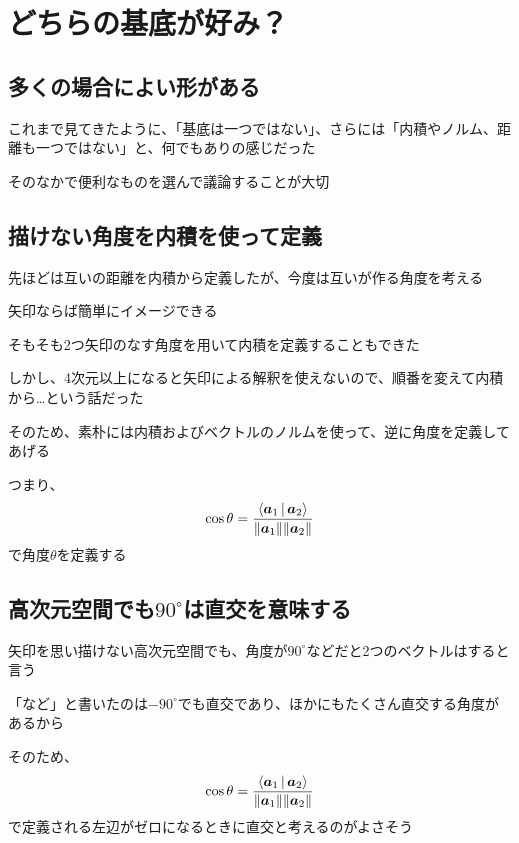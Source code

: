\documentclass[../book_half_step_linear]{subfiles}
\begin{document}
\section{どちらの基底が好み？}

\subsection{多くの場合によい形がある}

これまで見てきたように、「基底は一つではない」、さらには「内積やノルム、距離も一つではない」と、何でもありの感じだった

そのなかで便利なものを選んで議論することが大切

\sectionline
\subsection{描けない角度を内積を使って定義}

先ほどは互いの距離を内積から定義したが、今度は互いが作る角度を考える

\br

矢印ならば簡単にイメージできる

そもそも2つ矢印のなす角度を用いて内積を定義することもできた

\br

しかし、4次元以上になると矢印による解釈を使えないので、順番を変えて内積から…という話だった

そのため、素朴には内積およびベクトルのノルムを使って、逆に角度を定義してあげる

つまり、
\begin{equation*}
  \cos \theta = \frac{\Braket{\vb*{a}_1|\vb*{a}_2}}{\norm{\vb*{a}_1}\norm{\vb*{a}_2}}
\end{equation*}
で角度$\theta$を定義する

\sectionline
\subsection{高次元空間でも$90^\circ$は直交を意味する}

矢印を思い描けない高次元空間でも、角度が$90^\circ$などだと2つのベクトルはすると言う

「など」と書いたのは$-90^\circ$でも直交であり、ほかにもたくさん直交する角度があるから

そのため、
\begin{equation*}
  \cos \theta = \frac{\Braket{\vb*{a}_1|\vb*{a}_2}}{\norm{\vb*{a}_1}\norm{\vb*{a}_2}}
\end{equation*}
で定義される左辺がゼロになるときに直交と考えるのがよさそう
\end{document}
